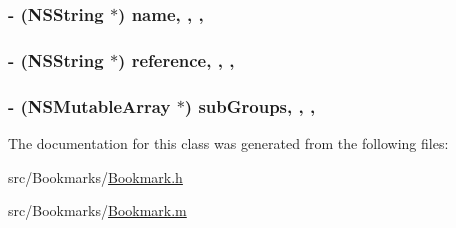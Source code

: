 \hypertarget{interface_bookmark_afc8ccc6676addc3b49a494b2bf969c68}{
\subsubsection[{name}]{\setlength{\rightskip}{0pt plus 5cm}-\/ (N\-S\-String $\ast$) name\hspace{0.3cm}{\ttfamily [read]}, {\ttfamily [write]}, {\ttfamily [atomic]}, {\ttfamily [retain]}}}\label{interface_bookmark_afc8ccc6676addc3b49a494b2bf969c68}
\hypertarget{interface_bookmark_a934a327293856e28b3dde0cab70e273c}{
\subsubsection[{reference}]{\setlength{\rightskip}{0pt plus 5cm}-\/ (N\-S\-String $\ast$) reference\hspace{0.3cm}{\ttfamily [read]}, {\ttfamily [write]}, {\ttfamily [atomic]}, {\ttfamily [retain]}}}\label{interface_bookmark_a934a327293856e28b3dde0cab70e273c}
\hypertarget{interface_bookmark_a17819aecf80f28455ff11ac871c8a381}{
\subsubsection[{sub\-Groups}]{\setlength{\rightskip}{0pt plus 5cm}-\/ (N\-S\-Mutable\-Array $\ast$) sub\-Groups\hspace{0.3cm}{\ttfamily [read]}, {\ttfamily [write]}, {\ttfamily [atomic]}, {\ttfamily [retain]}}}\label{interface_bookmark_a17819aecf80f28455ff11ac871c8a381}


The documentation for this class was generated from the following files\-:\begin{DoxyCompactItemize}
\item 
src/\-Bookmarks/\hyperlink{_bookmark_8h}{Bookmark.\-h}\item 
src/\-Bookmarks/\hyperlink{_bookmark_8m}{Bookmark.\-m}\end{DoxyCompactItemize}
